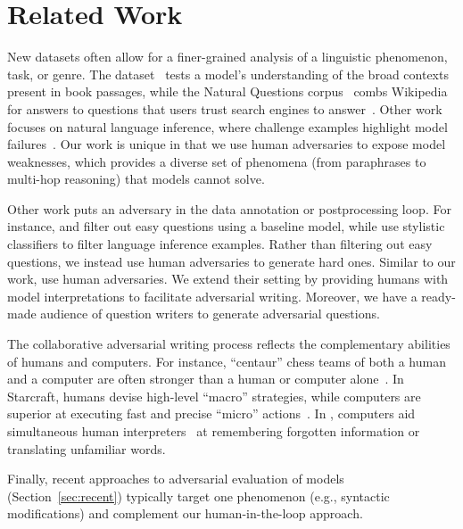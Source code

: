 \section{Related Work}
\label{sec:related}

New datasets often allow for a finer-grained analysis of a linguistic
phenomenon, task, or genre.  The 
dataset~\cite{paperno2016lambada} tests a model's understanding
of the broad contexts present in book passages, while the
Natural Questions corpus~\cite{kwiatkowski2019natural} combs Wikipedia for 
answers to questions that users trust search engines to
answer~\cite{oeldorf2014search}. Other work focuses on natural
language inference, where challenge examples highlight model
failures~\cite{wang2018glue,glockner2018breaking,naik2018stress}.  Our
work is unique in that we use human adversaries to expose model
weaknesses, which provides a diverse set of phenomena (from
paraphrases to multi-hop reasoning) that models cannot solve.

Other work puts an adversary in the data annotation or postprocessing loop.
For instance, \citet{dua2019drop} and \citet{zhang2018record} 
filter out easy questions using a baseline  model,
while \citet{zellers2018swag} use stylistic classifiers to filter
language inference examples. Rather than filtering out easy questions,
we instead use human adversaries to generate hard ones.
Similar to our work, \citet{ettinger2017towards} use human adversaries.
We extend their setting by providing humans with model interpretations to
facilitate adversarial writing. Moreover, we have a
ready-made audience of question writers to generate
adversarial questions.  

The collaborative adversarial writing process reflects
the complementary abilities of humans and computers.
For instance, ``centaur'' chess teams of both a human and a computer are often stronger
than a human or computer alone~\cite{Case2018How}. In Starcraft, 
humans devise high-level ``macro'' strategies, while computers
are superior at executing fast and precise ``micro'' actions~\cite{vinyals2017starcraft}. In , computers
aid simultaneous human interpreters~\cite{he2016interpretation} at remembering
forgotten information or translating unfamiliar words.

Finally, recent approaches to adversarial evaluation of
 models (Section~\ref{sec:recent}) typically
target one phenomenon (e.g., syntactic modifications) and
complement our human-in-the-loop approach.

